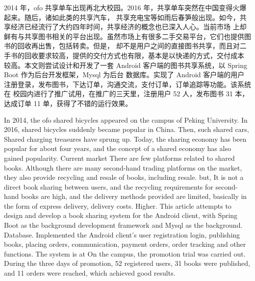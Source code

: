 

\begin{CHSabstract}

	2014 年，ofo 共享单车出现再北大校园。2016 年，共享单车突然在中国变得火爆起来。随后，诸如此类的共享汽车，
	共享充电宝等如雨后春笋般出现。如今，共享经济已经流行了大约四年时间，共享经济的概念也已深入人心。当前市场
	上却鲜有与共享图书相关的平台出现。虽然市场上有很多二手交易平台，它们也提供图书的回收再出售，包括转卖。但是，
	却不是用户之间的直接图书共享，而且对二手书的回收要求较高，提供的交付方式也有限，基本是以快递的方式，交付成本
	较高。本文则尝试设计和开发了一套 Android 客户端的图书共享系统，以 Spring Boot 作为后台开发框架，Mysql 为后台
	数据库。实现了 Android 客户端的用户注册登录，发布图书，下达订单，沟通交流，支付订单，订单追踪等功能。该系统在
	校园内进行了推广试用，在推广的三天里，注册用户 52 人，发布图书 31 本，达成订单 11 单，获得了不错的运行效果。

\end{CHSabstract}
\begin{ENGabstract}
	In 2014, the ofo shared bicycles appeared on the campus of Peking University. In 2016, shared bicycles suddenly became popular in China. Then, such shared cars,
	Shared charging treasures have sprung up. Today, the sharing economy has been popular for about four years, and the concept of a shared economy has also gained popularity. Current market
	There are few platforms related to shared books. Although there are many second-hand trading platforms on the market, they also provide recycling and resale of books, including resale. but,
	It is not a direct book sharing between users, and the recycling requirements for second-hand books are high, and the delivery methods provided are limited, basically in the form of express delivery, delivery costs.
	Higher. This article attempts to design and develop a book sharing system for the Android client, with Spring Boot as the background development framework and Mysql as the background.
	Database. Implemented the Android client's user registration login, publishing books, placing orders, communication, payment orders, order tracking and other functions. The system is at
	On the campus, the promotion trial was carried out. During the three days of promotion, 52 registered users, 31 books were published, and 11 orders were reached, which achieved good results.
\end{ENGabstract}

